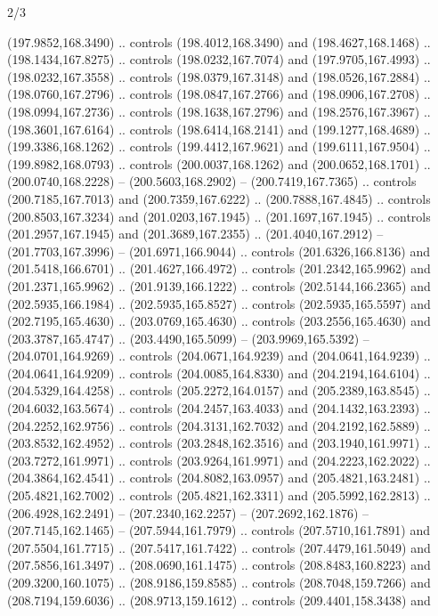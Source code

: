 \begin{flagdescription}{2/3}
\begin{scope}[xshift=0.5\flaglength,yshift=0.5\flagwidth,scale=\flagwidth/180]
\begin{scope}[y=0.8pt, x=0.8pt, yscale=-1,shift={(-168.75,-108.75)}]
  (197.9852,168.3490) .. controls (198.4012,168.3490) and (198.4627,168.1468) ..
  (198.1434,167.8275) .. controls (198.0232,167.7074) and (197.9705,167.4993) ..
  (198.0232,167.3558) .. controls (198.0379,167.3148) and (198.0526,167.2884) ..
  (198.0760,167.2796) .. controls (198.0847,167.2766) and (198.0906,167.2708) ..
  (198.0994,167.2736) .. controls (198.1638,167.2796) and (198.2576,167.3967) ..
  (198.3601,167.6164) .. controls (198.6414,168.2141) and (199.1277,168.4689) ..
  (199.3386,168.1262) .. controls (199.4412,167.9621) and (199.6111,167.9504) ..
  (199.8982,168.0793) .. controls (200.0037,168.1262) and (200.0652,168.1701) ..
  (200.0740,168.2228) -- (200.5603,168.2902) -- (200.7419,167.7365) .. controls
  (200.7185,167.7013) and (200.7359,167.6222) .. (200.7888,167.4845) .. controls
  (200.8503,167.3234) and (201.0203,167.1945) .. (201.1697,167.1945) .. controls
  (201.2957,167.1945) and (201.3689,167.2355) .. (201.4040,167.2912) --
  (201.7703,167.3996) -- (201.6971,166.9044) .. controls (201.6326,166.8136) and
  (201.5418,166.6701) .. (201.4627,166.4972) .. controls (201.2342,165.9962) and
  (201.2371,165.9962) .. (201.9139,166.1222) .. controls (202.5144,166.2365) and
  (202.5935,166.1984) .. (202.5935,165.8527) .. controls (202.5935,165.5597) and
  (202.7195,165.4630) .. (203.0769,165.4630) .. controls (203.2556,165.4630) and
  (203.3787,165.4747) .. (203.4490,165.5099) -- (203.9969,165.5392) --
  (204.0701,164.9269) .. controls (204.0671,164.9239) and (204.0641,164.9239) ..
  (204.0641,164.9209) .. controls (204.0085,164.8330) and (204.2194,164.6104) ..
  (204.5329,164.4258) .. controls (205.2272,164.0157) and (205.2389,163.8545) ..
  (204.6032,163.5674) .. controls (204.2457,163.4033) and (204.1432,163.2393) ..
  (204.2252,162.9756) .. controls (204.3131,162.7032) and (204.2192,162.5889) ..
  (203.8532,162.4952) .. controls (203.2848,162.3516) and (203.1940,161.9971) ..
  (203.7272,161.9971) .. controls (203.9264,161.9971) and (204.2223,162.2022) ..
  (204.3864,162.4541) .. controls (204.8082,163.0957) and (205.4821,163.2481) ..
  (205.4821,162.7002) .. controls (205.4821,162.3311) and (205.5992,162.2813) ..
  (206.4928,162.2491) -- (207.2340,162.2257) -- (207.2692,162.1876) --
  (207.7145,162.1465) -- (207.5944,161.7979) .. controls (207.5710,161.7891) and
  (207.5504,161.7715) .. (207.5417,161.7422) .. controls (207.4479,161.5049) and
  (207.5856,161.3497) .. (208.0690,161.1475) .. controls (208.8483,160.8223) and
  (209.3200,160.1075) .. (208.9186,159.8585) .. controls (208.7048,159.7266) and
  (208.7194,159.6036) .. (208.9713,159.1612) .. controls (209.4401,158.3438) and

\end{scope}
\end{scope}
\end{flagdescription}

